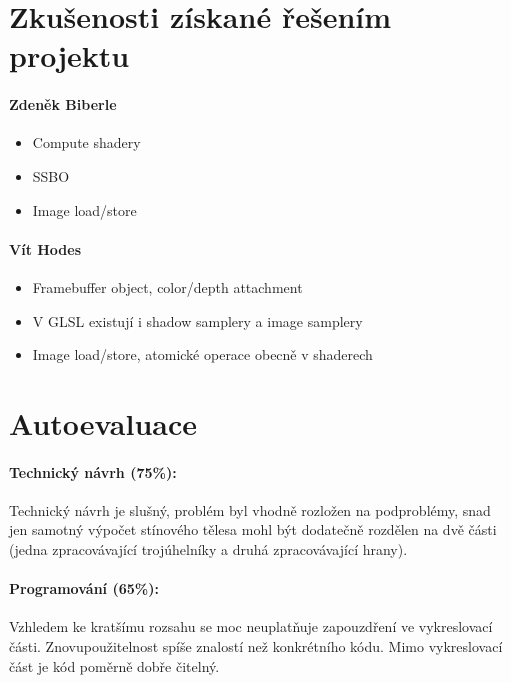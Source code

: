 \documentclass[11pt,a4paper]{article}
\begin{document}
\section{Zkušenosti získané řešením projektu}

\paragraph{Zdeněk Biberle}
\begin{itemize}
	\item Compute shadery
	\item SSBO
	\item Image load/store
\end{itemize}

\paragraph{Vít Hodes}
\begin{itemize}
	\item Framebuffer object, color/depth attachment
	\item V GLSL existují i shadow samplery a image samplery
	\item Image load/store, atomické operace obecně v shaderech
	
\end{itemize}

\section{Autoevaluace}

\paragraph{Technický návrh (75\%):}
Technický návrh je slušný, problém byl vhodně rozložen na podproblémy, snad jen samotný výpočet stínového tělesa mohl být dodatečně rozdělen na dvě části (jedna zpracovávající trojúhelníky a druhá zpracovávající hrany).


\paragraph{Programování (65\%):} 
Vzhledem ke kratšímu rozsahu se moc neuplatňuje zapouzdření ve vykreslovací části. Znovupoužitelnost
spíše znalostí než konkrétního kódu. Mimo vykreslovací část je kód poměrně dobře čitelný.
\end{document}
